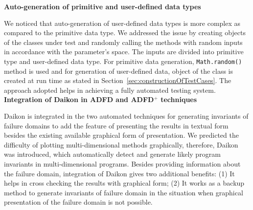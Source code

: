 \textbf{Auto-generation of primitive and user-defined data types}

We noticed that auto-generation of user-defined data types is more complex as compared to the primitive data type. We addressed the issue by creating objects of the classes under test and randomly calling the methods with random inputs in accordance with the parameter's space. The inputs are divided into primitive type and user-defined data type.  For primitive data generation, \verb+Math.random()+ method is used and for generation of user-defined data, object of the class is created at run time as stated in Section~\ref{sec:constructionOfTestCases}. The approach adopted helps in achieving a fully automated testing system.\\








\textbf{Integration of Daikon in ADFD and ADFD$^+$ techniques}

Daikon is integrated in the two automated techniques for generating invariants of failure domains to add the feature of  presenting the results in textual form besides the existing available graphical form of presentation. We predicted the difficulty of plotting multi-dimensional methods graphically, therefore, Daikon was introduced, which automatically detect and generate likely program invariants in multi-dimensional programs. Besides providing information about the failure domain, integration of Daikon gives two additional benefits: (1) It helps in cross checking the results with graphical form; (2) It works as a backup method to generate invariants of failure domain in the situation when graphical presentation of the failure domain is not possible. \\
\clearpage



